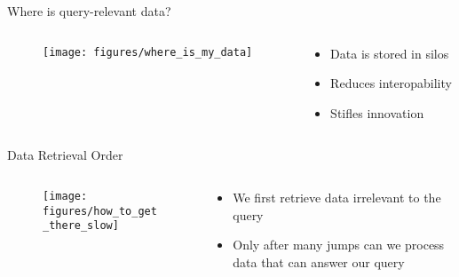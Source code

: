 \begin{frame}{Where is query-relevant data?}
    \begin{columns}[T] %
        \begin{column}{.48\textwidth}

       \begin{figure}
            \centering
            \texttt{[image: figures/where\_is\_my\_data]}
        \end{figure}

        \end{column}%
        \hfill%
        \begin{column}{.48\textwidth}
            \bigskip
            \begin{itemize}
                \item Data is stored in silos
                \item Reduces interopability
                \item Stifles innovation
            \end{itemize}
        \end{column}%
    \end{columns}
\end{frame}

\begin{frame}{Data Retrieval Order}
    \begin{columns}[T] %
        \begin{column}{.48\textwidth}

       \begin{figure}
            \centering
            \texttt{[image: figures/how\_to\_get\_there\_slow]}
        \end{figure}

        \end{column}%
        \hfill%
        \begin{column}{.48\textwidth}
            \bigskip
            \begin{itemize}
                \item We first retrieve data irrelevant to the query
                \item Only after many jumps can we process data that can answer our query
            \end{itemize}
        \end{column}%
    \end{columns}
\end{frame}


